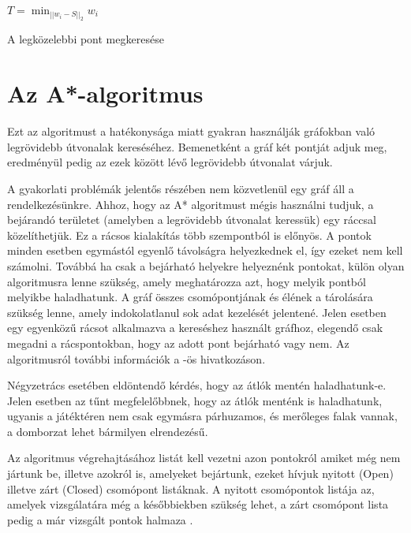 \begin{algorithm}[H]
  $\displaystyle T = \min_{||w_i - S||_2} w_i$
  \caption{A legközelebbi pont megkeresése}
\end{algorithm} 

\section{Az A*-algoritmus}

Ezt az algoritmust a hatékonysága miatt gyakran használják gráfokban való legrövidebb útvonalak kereséséhez. Bemenetként a gráf két pontját adjuk meg, eredményül pedig az ezek között lévő legrövidebb útvonalat várjuk.

A gyakorlati problémák jelentős részében nem közvetlenül egy gráf áll a rendelkezésünkre. Ahhoz, hogy az A* algoritmust mégis használni tudjuk, a bejárandó területet (amelyben a legrövidebb útvonalat keressük) egy ráccsal közelíthetjük. Ez a rácsos kialakítás több szempontból is előnyös. A pontok minden esetben egymástól egyenlő távolságra helyezkednek el, így ezeket nem kell számolni. Továbbá ha csak a bejárható helyekre helyeznénk pontokat, külön olyan algoritmusra lenne szükség, amely meghatározza azt, hogy melyik pontból melyikbe haladhatunk. A gráf összes csomópontjának és élének a tárolására szükség lenne, amely indokolatlanul sok adat kezelését jelentené. Jelen esetben egy egyenközű rácsot alkalmazva a kereséshez használt gráfhoz, elegendő csak megadni a rácspontokban, hogy az adott pont bejárható vagy nem. Az algoritmusról további információk a \cite{Astar}-ös hivatkozáson.

Négyzetrács esetében eldöntendő kérdés, hogy az átlók mentén haladhatunk-e. Jelen esetben az tűnt megfelelőbbnek, hogy az átlók menténk is haladhatunk, ugyanis a játéktéren nem csak egymásra párhuzamos, és merőleges falak vannak, a domborzat lehet bármilyen elrendezésű.

Az algoritmus végrehajtásához listát kell vezetni azon pontokról amiket még nem jártunk be, illetve azokról is, amelyeket bejártunk, ezeket hívjuk nyitott (Open) illetve zárt (Closed) csomópont listáknak. A nyitott csomópontok listája az, amelyek vizsgálatára még a későbbiekben szükség lehet, a zárt csomópont lista pedig a már vizsgált pontok halmaza \cite{Astar2}.

